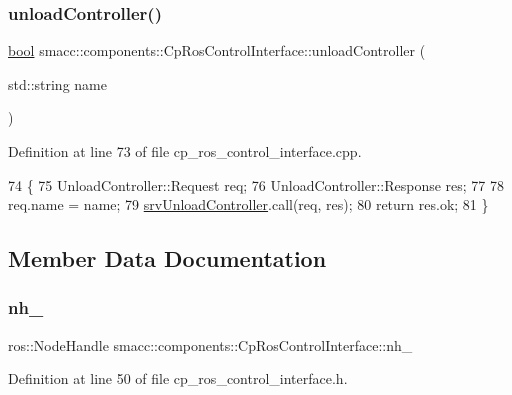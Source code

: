 \subsubsection{\texorpdfstring{unload\+Controller()}{unloadController()}}
{\footnotesize\ttfamily \hyperlink{classbool}{bool} smacc\+::components\+::\+Cp\+Ros\+Control\+Interface\+::unload\+Controller (\begin{DoxyParamCaption}\item[{std\+::string}]{name }\end{DoxyParamCaption})}



Definition at line 73 of file cp\+\_\+ros\+\_\+control\+\_\+interface.\+cpp.


\begin{DoxyCode}
74 \{
75     UnloadController::Request req;
76     UnloadController::Response res;
77 
78     req.name = name;
79     \hyperlink{classsmacc_1_1components_1_1CpRosControlInterface_a0515a2a86bfcd0fdec08fabd3070723c}{srvUnloadController}.call(req, res);
80     \textcolor{keywordflow}{return} res.ok;
81 \}
\end{DoxyCode}


\subsection{Member Data Documentation}
\mbox{\label{classsmacc_1_1components_1_1CpRosControlInterface_a58b15bd11d13cb02813232c6e50adbd2}} 
\subsubsection{\texorpdfstring{nh\+\_\+}{nh\_}}
{\footnotesize\ttfamily ros\+::\+Node\+Handle smacc\+::components\+::\+Cp\+Ros\+Control\+Interface\+::nh\+\_\+\hspace{0.3cm}{\ttfamily [private]}}



Definition at line 50 of file cp\+\_\+ros\+\_\+control\+\_\+interface.\+h.

\mbox{\label{classsmacc_1_1components_1_1CpRosControlInterface_ac7831d58e5de5a78ff0baeb876f9157b}} 
